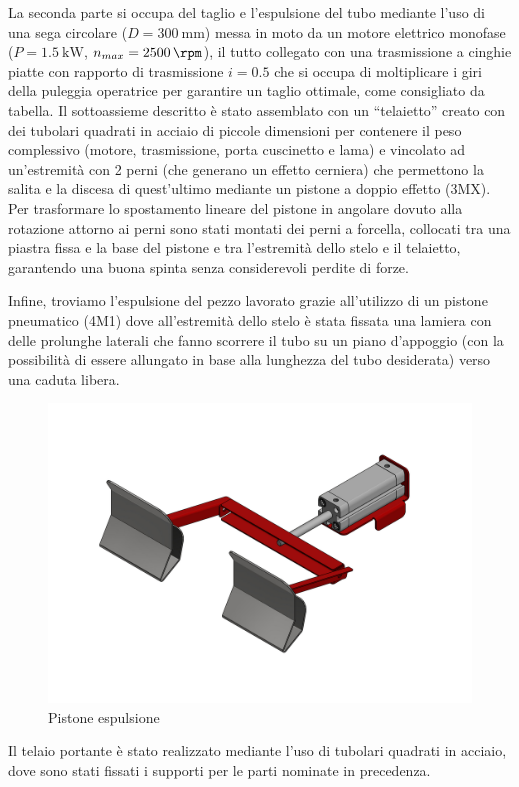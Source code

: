 \documentclass{report}
\begin{document}
La seconda parte si occupa del taglio e l’espulsione del tubo mediante l’uso di una sega circolare ($D=\SI{300}{\mm}$) messa in moto da un motore elettrico monofase ($P = \SI{1,5}{\kW}$, $n_{max}=\SI{2500}{\rpm}$), il tutto collegato con una trasmissione a cinghie piatte con rapporto di trasmissione $i=\num{0.5}$ che si occupa di moltiplicare i giri della puleggia operatrice per garantire un taglio ottimale, come consigliato da tabella. Il sottoassieme descritto è stato assemblato con un “telaietto” creato con dei tubolari quadrati in acciaio di piccole dimensioni per contenere il peso complessivo (motore, trasmissione, porta cuscinetto e lama) e vincolato ad un’estremità con 2 perni (che generano un effetto cerniera) che permettono la salita e la discesa di quest’ultimo mediante un pistone a doppio effetto (3MX). Per trasformare lo spostamento lineare del pistone in angolare dovuto alla rotazione attorno ai perni sono stati montati dei perni a forcella, collocati tra una piastra fissa e la base del pistone e tra l’estremità dello stelo e il telaietto, garantendo una buona spinta senza considerevoli perdite di forze. 

Infine, troviamo l’espulsione del pezzo lavorato grazie all’utilizzo di un pistone pneumatico (4M1) dove all’estremità dello stelo è stata fissata una lamiera con delle prolunghe laterali che fanno scorrere il tubo su un piano d’appoggio (con la possibilità di essere allungato in base alla lunghezza del tubo desiderata) verso una caduta libera.
\begin{figure}[H]
  \centering
  \includegraphics[width=\textwidth]{src/img/espulsione.pdf}
  \caption{Pistone espulsione}
  \label{fig:espulsione}
\end{figure}
Il telaio portante è stato realizzato mediante l’uso di tubolari quadrati in acciaio, dove sono stati fissati i supporti per le parti nominate in precedenza.
\end{document}
